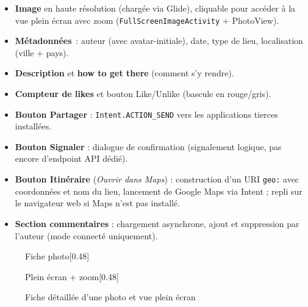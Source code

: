 \documentclass[12pt, a4paper, openany]{report}
\begin{document}
\begin{itemize}
  \item \textbf{Image} en haute résolution (chargée via Glide), cliquable pour accéder à
        la vue plein écran avec zoom (\texttt{FullScreenImageActivity} + PhotoView).
  \item \textbf{Métadonnées}~: auteur (avec avatar-initiale), date, type de lieu, localisation
        (ville + pays).
  \item \textbf{Description} et \textbf{how to get there} (comment s'y rendre).
  \item \textbf{Compteur de likes} et bouton Like/Unlike (bascule en rouge/gris).
  \item \textbf{Bouton Partager} : \texttt{Intent.ACTION\_SEND} vers les applications
        tierces installées.
  \item \textbf{Bouton Signaler} : dialogue de confirmation (signalement logique, pas encore
        d'endpoint API dédié).
  \item \textbf{Bouton Itinéraire} (\emph{Ouvrir dans Maps}) : construction d'un URI
        \texttt{geo:} avec coordonnées et nom du lieu, lancement de Google Maps via Intent ;
        repli sur le navigateur web si Maps n'est pas installé.
  \item \textbf{Section commentaires} : chargement asynchrone, ajout et suppression par
        l'auteur (mode connecté uniquement).
\end{itemize}

\begin{figure}[H]
  \centering
  \begin{subcaptionbox}{Fiche photo\label{fig:detail_main}}[0.48\textwidth]
  \end{subcaptionbox}
  \hfill
  \begin{subcaptionbox}{Plein écran + zoom\label{fig:detail_fullscreen}}[0.48\textwidth]
  \end{subcaptionbox}
  \caption{Fiche détaillée d'une photo et vue plein écran}
  \label{fig:photo_detail}
\end{figure}
\end{document}
